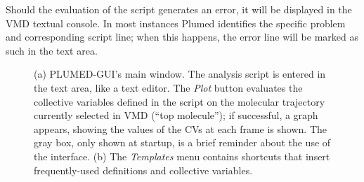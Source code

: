 \documentclass[preprint,12pt]{elsarticle}
\begin{document}
Should the evaluation of the script generates an error, it will be
displayed in the VMD textual console.  In most instances Plumed
identifies the specific problem and corresponding script line; when this
happens, the error line will be marked as such
in the text area.



\begin{figure}
  \centering
  \caption{(a) PLUMED-GUI's main window.  The analysis script is
    entered in the text area, like a text editor. The \emph{Plot}
    button evaluates the collective variables defined in the script on
    the molecular trajectory currently selected in VMD (``top
    molecule''); if successful, a graph appears, showing the values of
    the CVs at each frame is shown. The gray box, only shown at
    startup, is a brief reminder about the use of the interface. (b)
    The \emph{Templates} menu contains shortcuts that insert
    frequently-used definitions and collective variables. }
\end{figure}
\end{document}
